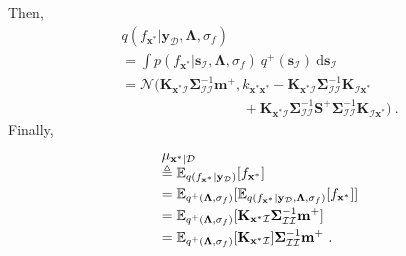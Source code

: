 \documentclass[conference]{IEEEtran}
\begin{document}
	Then,
	\begin{equation*}
		\begin{array}{l}
			\displaystyle q(f_{\mathbf{x}^*}|\mathbf{y}_\mathcal{D},\mathbf{\Lambda},\sigma_f)\\
			\displaystyle=\int p(f_{\mathbf{x}^*}|\mathbf{s}_\mathcal{I},\mathbf{\Lambda},\sigma_f)\ q^+(\mathbf{s}_\mathcal{I})\ \mathrm{d}\mathbf{s}_\mathcal{I} \\
			\displaystyle =\mathcal{N}(\mathbf{K}_{\mathbf{x}^*\mathcal{I}}\mathbf{\Sigma}_\mathcal{II}^{-1}\mathbf{m}^+,k_{\mathbf{x}^*\mathbf{x}^*}-\mathbf{K}_{\mathbf{x}^*\mathcal{I}}\mathbf{\Sigma}_\mathcal{II}^{-1}\mathbf{K}_{\mathcal{I}\mathbf{x}^*}\\
			\displaystyle\qquad\qquad\qquad\qquad\ \ \  +\mathbf{K}_{\mathbf{x}^*\mathcal{I}}\mathbf{\Sigma}_\mathcal{II}^{-1}\mathbf{S}^+\mathbf{\Sigma}_\mathcal{II}^{-1}\mathbf{K}_{\mathcal{I}\mathbf{x}^*})\ .
		\end{array}
	\end{equation*}
	Finally, 	
	\begin{equation*}
		\begin{array}{l}
			\displaystyle\mu_{\mathbf{x}^*|\mathcal{D}}\\
			\displaystyle\triangleq\mathbb{E}_{q(f_{\mathbf{x}^*}|\mathbf{y}_\mathcal{D})}[f_{\mathbf{x}^*}]\vspace{1mm}\\
			\displaystyle=\mathbb{E}_{q^+(\mathbf{\Lambda},\sigma_f)}[\mathbb{E}_{q(f_{\mathbf{x}^*}|\mathbf{y}_\mathcal{D},\mathbf{\Lambda}, \sigma_f)}[f_{\mathbf{x}^*}]] \vspace{1mm}\\
			\displaystyle=\mathbb{E}_{q^+(\mathbf{\Lambda},\sigma_f)}[ \mathbf{K}_{\mathbf{x}^*\mathcal{I}}\mathbf{\Sigma}_\mathcal{II}^{-1}\mathbf{m}^+ ] \vspace{1mm}\\
			\displaystyle=\mathbb{E}_{q^+(\mathbf{\Lambda},\sigma_f)}[\mathbf{\mathbf{K}}_{\mathbf{x}^*\mathcal{I}}]\mathbf{\Sigma}_\mathcal{II}^{-1}\mathbf{m}^+\ .
		\end{array}
	\end{equation*}		
\end{document}

